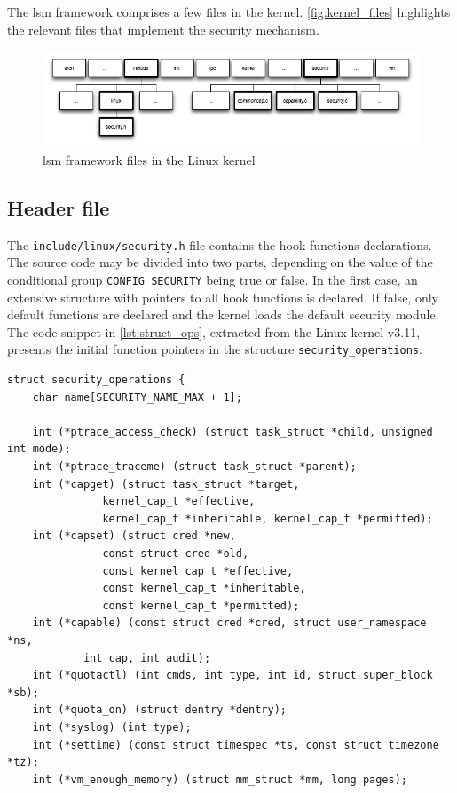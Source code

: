 The \gls{lsm} framework comprises a few files in the kernel. \autoref{fig:kernel_files} highlights the relevant files that implement the security mechanism.

\begin{figure}[htbp]
 \centering
 \includegraphics[scale=0.5]{images/kernel_files.jpg}
 \caption{\gls{lsm} framework files in the Linux kernel}
 \label{fig:kernel_files}
\end{figure}

\subsection{Header file}
\label{sec:header_file}

The \texttt{include/linux/security.h} file contains the hook functions declarations. The source code may be divided into two parts, depending on the value of the conditional group \texttt{CONFIG\_SECURITY} being true or false. In the first case, an extensive structure with pointers to all hook functions is declared. If false, only default functions are declared and the kernel loads the default security module. The code snippet in \autoref{lst:struct_ops}, extracted from the Linux kernel v3.11, presents the initial function pointers in the structure \texttt{security\_operations}.

\begin{lstlisting}[frame=none, numbers=none, caption=Security structure declaration (Linux kernel v3.11), label=lst:struct_ops]
struct security_operations {
	char name[SECURITY_NAME_MAX + 1];

	int (*ptrace_access_check) (struct task_struct *child, unsigned int mode);
	int (*ptrace_traceme) (struct task_struct *parent);
	int (*capget) (struct task_struct *target,
		       kernel_cap_t *effective,
		       kernel_cap_t *inheritable, kernel_cap_t *permitted);
	int (*capset) (struct cred *new,
		       const struct cred *old,
		       const kernel_cap_t *effective,
		       const kernel_cap_t *inheritable,
		       const kernel_cap_t *permitted);
	int (*capable) (const struct cred *cred, struct user_namespace *ns,
			int cap, int audit);
	int (*quotactl) (int cmds, int type, int id, struct super_block *sb);
	int (*quota_on) (struct dentry *dentry);
	int (*syslog) (int type);
	int (*settime) (const struct timespec *ts, const struct timezone *tz);
	int (*vm_enough_memory) (struct mm_struct *mm, long pages);
\end{lstlisting}

